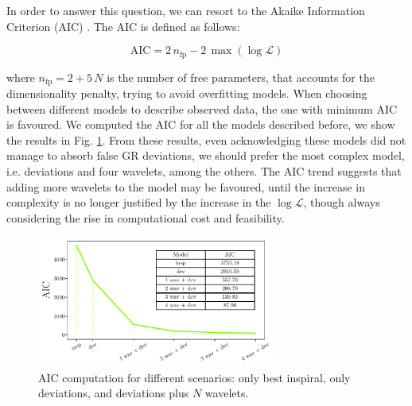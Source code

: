 In order to answer this question, we can resort to the Akaike Information Criterion (AIC) \cite{1100705}. The AIC is defined as follows:

\begin{equation}
\mathrm{AIC} = 2\,n_{\mathrm{fp}} - 2\,\max\left( \log \mathcal{L} \right)
\end{equation}

\noindent
where $n_{\mathrm{fp}} = 2 + 5 \, N $ is the number of free parameters, that accounts for the dimensionality penalty, trying to avoid overfitting models. When choosing between different models to describe observed data, the one with minimum AIC is favoured. We computed the AIC for all the models described before, we show the results in Fig. \ref{fig:AIC}. From these results, even acknowledging these models did not manage to absorb false GR deviations, we should prefer the most complex model, i.e. deviations and four wavelets, among the others. The AIC trend suggests that adding more wavelets to the model may be favoured, until the increase in complexity is no longer justified by the increase in the $\log \mathcal{L}$, though always considering the rise in computational cost and feasibility.


\begin{figure}[H]
    \centering
    \includegraphics[width=0.7\textwidth]{Images/AIC.pdf}
    \caption{AIC computation for different scenarios: only best inspiral, only deviations, and deviations plus $N$ wavelets.}
    \label{fig:AIC}
\end{figure}
